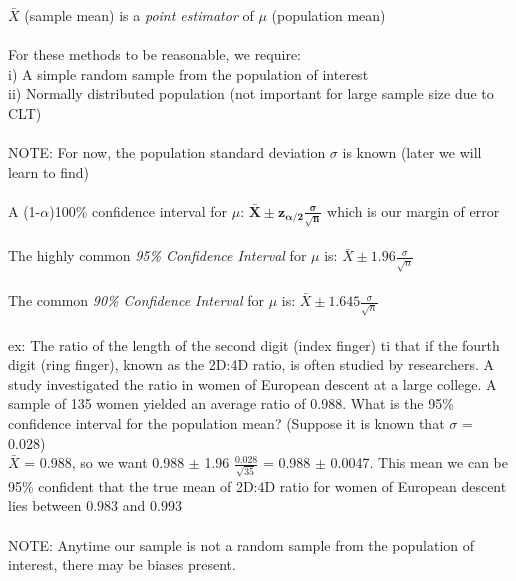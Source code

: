 \documentclass[12pt, a4paper]{article}
\begin{document}
	\noindent $\bar{X}$ (sample mean) is a \textit{point estimator} of $\mu$ (population mean) \\~\\
	For these methods to be reasonable, we require: \\
	i) A simple random sample from the population of interest \\
	ii) Normally distributed population (not important for large sample size due to CLT) \\~\\
	NOTE: For now, the population standard deviation $\sigma$ is known (later we will learn to find) \\~\\
	A (1-$\alpha$)100\% confidence interval for $\mu$:
	\large $\mathbf{\bar{X} \pm z_{\alpha/2}\frac{\sigma}{\sqrt{n}}}$ \normalsize which is our margin of error \\~\\
	The highly common \textit{95\% Confidence Interval} for $\mu$ is: $\bar{X} \pm 1.96 \frac{\sigma}{\sqrt{n}}$ \\~\\
	The common \textit{90\% Confidence Interval} for $\mu$ is: $\bar{X} \pm 1.645 \frac{\sigma}{\sqrt{n}}$ \\~\\
	ex: The ratio of the length of the second digit (index finger) ti that if the fourth digit (ring finger), known as the 2D:4D ratio, is often studied by researchers. A study investigated the ratio in women of European descent at a large college. A sample of 135 women yielded an average ratio of 0.988. What is the 95\% confidence interval for the population mean? (Suppose it is known that $\sigma$ = 0.028)\\
	$\bar{X}$ = 0.988, so we want 0.988 $\pm$ 1.96 $\frac{0.028}{\sqrt{35}}$ = 0.988 $\pm$ 0.0047. This mean we can be 95\% confident that the true mean of 2D:4D ratio for women of European descent lies between 0.983 and 0.993 \\~\\
	NOTE: Anytime our sample is not a random sample from the population of interest, there may be biases present. \\~\\
	
\end{document}
